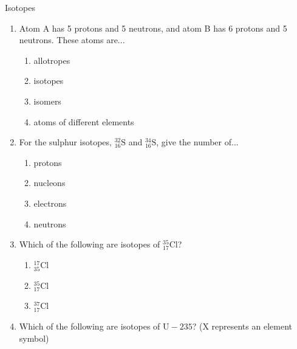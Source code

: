    \begin{exercises}  {Isotopes }
            \nopagebreak
        \label{m38753*id258162}\begin{enumerate}[noitemsep, label=\textbf{\arabic*}. ] 
            \label{m38753*uid50}\item Atom A has 5 protons and 5 neutrons, and atom B has 6 protons and 5 neutrons. These atoms are...
\label{m38753*id258178}\begin{enumerate}[noitemsep, label=\textbf{\alph*}. ] 
            \label{m38753*uid51}\item allotropes
\label{m38753*uid52}\item isotopes
\label{m38753*uid53}\item isomers
\label{m38753*uid54}\item atoms of different elements
\end{enumerate}
                \label{m38753*uid55}\item For the sulphur isotopes, $_{16}^{32}\mathrm{S}$ and $_{16}^{34}\mathrm{S}$, give the number of...
\label{m38753*id258277}\begin{enumerate}[noitemsep, label=\textbf{\alph*}. ] 
            \label{m38753*uid56}\item protons
\label{m38753*uid57}\item nucleons
\label{m38753*uid58}\item electrons
\label{m38753*uid59}\item neutrons
\end{enumerate}
                \label{m38753*uid60}\item Which of the following are isotopes of $_{17}^{35}\mathrm{Cl}$?
\label{m38753*id258355}\begin{enumerate}[noitemsep, label=\textbf{\alph*}. ] 
            \label{m38753*uid61}\item $_{35}^{17}\mathrm{Cl}$
\label{m38753*uid62}\item $_{17}^{35}\mathrm{Cl}$
\label{m38753*uid63}\item $_{17}^{37}\mathrm{Cl}$
\end{enumerate}
                \label{m38753*uid64}\item Which of the following are isotopes of $\mathrm{U-}235$? (X represents an element symbol)

\end{enumerate}
\end{exercises}
